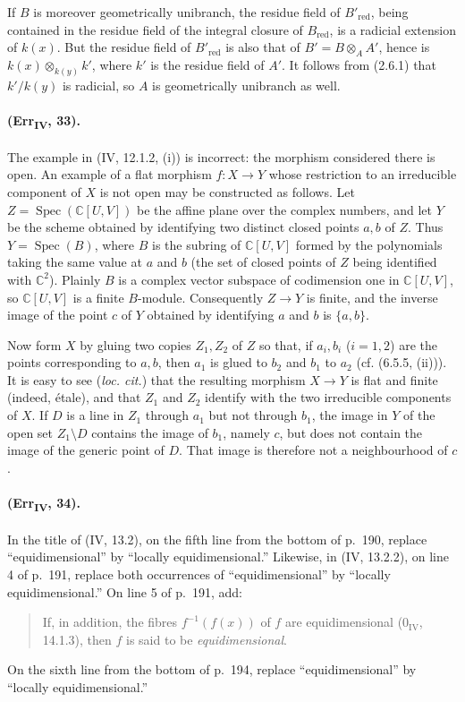 {If $B$ is moreover geometrically unibranch, the residue field of
$B'_{\mathrm{red}}$, being contained in the residue field of the
integral closure of $B_{\mathrm{red}}$, is a radicial extension of
$k(x)$.  But the residue field of $B'_{\mathrm{red}}$ is also that of
$B'=B\otimes_A A'$, hence is
$k(x)\otimes_{k(y)}k'$, where $k'$ is the residue field of $A'$.  It
follows from (2.6.1) that $k'/k(y)$ is radicial, so $A$ is geometrically
unibranch as well.

\paragraph{(Err\textsubscript{IV}, 33).}
The example in (IV, 12.1.2, (i)) is incorrect: the morphism considered
there is open.  An example of a flat morphism $f:X\to Y$ whose
restriction to an irreducible component of $X$ is not open may be
constructed as follows.  Let
$Z=\operatorname{Spec}(\mathbb C[U,V])$ be the affine plane over the
complex numbers, and let $Y$ be the scheme obtained by identifying two
distinct closed points $a,b$ of $Z$.  Thus $Y=\operatorname{Spec}(B)$,
where $B$ is the subring of $\mathbb C[U,V]$ formed by the polynomials
taking the same value at $a$ and $b$ (the set of closed points of $Z$
being identified with $\mathbb C^2$).  Plainly $B$ is a complex vector
subspace of codimension one in $\mathbb C[U,V]$, so
$\mathbb C[U,V]$ is a finite $B$-module.  Consequently $Z\to Y$ is
finite, and the inverse image of the point $c$ of $Y$ obtained by
identifying $a$ and $b$ is $\{a,b\}$.

Now form $X$ by gluing two copies $Z_1,Z_2$ of $Z$ so that, if
$a_i,b_i$ ($i=1,2$) are the points corresponding to $a,b$, then $a_1$
is glued to $b_2$ and $b_1$ to $a_2$ (cf. (6.5.5, (ii))).  It is easy
to see (\emph{loc. cit.}) that the resulting morphism $X\to Y$ is flat
and finite (indeed, \'{e}tale), and that $Z_1$ and $Z_2$ identify with
the two irreducible components of $X$.  If $D$ is a line in $Z_1$
through $a_1$ but not through $b_1$, the image in $Y$ of the open set
$Z_1\setminus D$ contains the image of $b_1$, namely $c$, but does not
contain the image of the generic point of $D$.  That image is therefore
not a neighbourhood of $c$.

\paragraph{(Err\textsubscript{IV}, 34).}
In the title of (IV, 13.2), on the fifth line from the bottom of p.~190,
replace ``equidimensional'' by ``locally equidimensional.''  Likewise,
in (IV, 13.2.2), on line 4 of p.~191, replace both occurrences of
``equidimensional'' by ``locally equidimensional.''  On line 5 of
p.~191, add:
\begin{quote}
If, in addition, the fibres $f^{-1}(f(x))$ of $f$ are equidimensional
($0_{\mathrm{IV}}$, 14.1.3), then $f$ is said to be
\emph{equidimensional}.
\end{quote}
On the sixth line from the bottom of p.~194, replace
``equidimensional'' by ``locally equidimensional.''

}
